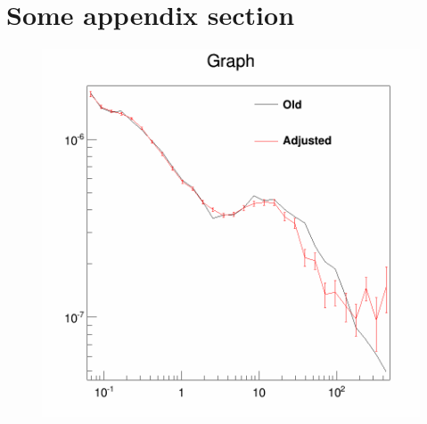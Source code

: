 
\appendix
{}

\section{Some appendix section}
\label{app:fitresults}



\begin{figure}[H]
  \centering
  \begin{minipage}[h]{0.45\textwidth}
  	\centering
	\includegraphics[width=1.\linewidth]{pic/method/app_iso_process_1.png}
  	\subcaption{}
  	\label{app:app_iso_process_1}
  \end{minipage}
  \hfill
  \begin{minipage}[h]{0.45\textwidth}
  	\centering

\end{minipage}
\end{figure}

